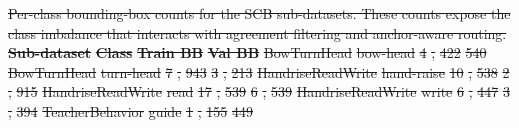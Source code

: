 \documentclass{ieeeaccess}
\providecommand{\DIFdel}[1]{{\protect\color{red}\sout{#1}}}                      %
\providecommand{\DIFdelbegin}{} %
\providecommand{\DIFdelFL}[1]{\DIFdel{#1}} %
\newcommand{\DIFscaledelfig}{0.5}
\newlength{\DIFdelgraphicswidth} %
\newlength{\DIFdelgraphicsheight} %
\newcommand{\DIFdelincludegraphics}[2][]{%
\sbox{\DIFdelgraphicsbox}{\DIFOincludegraphics[#1]{#2}}%
\settoboxwidth{\DIFdelgraphicswidth}{\DIFdelgraphicsbox} %
\settoboxtotalheight{\DIFdelgraphicsheight}{\DIFdelgraphicsbox} %
\scalebox{\DIFscaledelfig}{%
\parbox[b]{\DIFdelgraphicswidth}{\usebox{\DIFdelgraphicsbox}\\[-\baselineskip] \rule{\DIFdelgraphicswidth}{0em}}\llap{\resizebox{\DIFdelgraphicswidth}{\DIFdelgraphicsheight}{%
\setlength{\unitlength}{\DIFdelgraphicswidth}%
\begin{picture}(1,1)%
\thicklines\linethickness{2pt} %
{\color[rgb]{1,0,0}\put(0,0){\framebox(1,1){}}}%
{\color[rgb]{1,0,0}\put(0,0){\line( 1,1){1}}}%
{\color[rgb]{1,0,0}\put(0,1){\line(1,-1){1}}}%
\end{picture}%
}\hspace*{3pt}}} %
} %
\DeclareRobustCommand{\DIFdelbegin}{\DIFOdelbegin \let\includegraphics\DIFdelincludegraphics} %
\begin{document}
\DIFdelbegin %
{%
\DIFdelFL{Per-class bounding-box counts for the SCB sub-datasets.
These counts expose the class imbalance that interacts with agreement
filtering and anchor-aware routing.}}
\DIFdelFL{\textbf{Sub-dataset}} %
\DIFdelFL{\textbf{Class}} %
\DIFdelFL{\textbf{Train BB}} %
\DIFdelFL{\textbf{Val BB}} %
\DIFdelFL{BowTurnHead }%
\DIFdelFL{bow-head }%
\DIFdelFL{4}%
\DIFdelFL{,}%
\DIFdelFL{422 }%
\DIFdelFL{540 }%
\DIFdelFL{BowTurnHead }%
\DIFdelFL{turn-head }%
\DIFdelFL{7}%
\DIFdelFL{,}%
\DIFdelFL{943 }%
\DIFdelFL{3}%
\DIFdelFL{,}%
\DIFdelFL{213 }%
\DIFdelFL{HandriseReadWrite }%
\DIFdelFL{hand-raise }%
\DIFdelFL{10}%
\DIFdelFL{,}%
\DIFdelFL{538 }%
\DIFdelFL{2}%
\DIFdelFL{,}%
\DIFdelFL{915 }%
\DIFdelFL{HandriseReadWrite }%
\DIFdelFL{read }%
\DIFdelFL{17}%
\DIFdelFL{,}%
\DIFdelFL{539 }%
\DIFdelFL{6}%
\DIFdelFL{,}%
\DIFdelFL{539 }%
\DIFdelFL{HandriseReadWrite }%
\DIFdelFL{write }%
\DIFdelFL{6}%
\DIFdelFL{,}%
\DIFdelFL{447 }%
\DIFdelFL{3}%
\DIFdelFL{,}%
\DIFdelFL{394 }%
\DIFdelFL{TeacherBehavior }%
\DIFdelFL{guide }%
\DIFdelFL{1}%
\DIFdelFL{,}%
\DIFdelFL{155 }%
\DIFdelFL{449 }%
\end{document}
